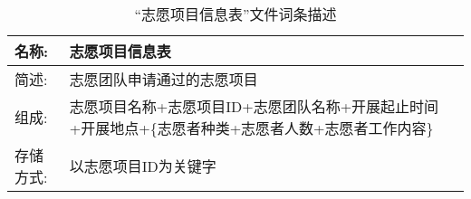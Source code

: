 \begin{table}[H]
  \begin{center}
    \caption{“志愿项目信息表”文件词条描述}
    \begin{tabular}{l p{10cm}}
      \hline
      名称: &  志愿项目信息表\\
      \hline
      简述:  &  志愿团队申请通过的志愿项目\\
      \hline
      组成:  &  志愿项目名称+志愿项目ID+志愿团队名称+开展起止时间+开展地点+\{志愿者种类+志愿者人数+志愿者工作内容\}\\
      \hline
      存储方式:  &  以志愿项目ID为关键字\\
      \hline
    \end{tabular}
    \label{志愿项目信息表}
  \end{center}
\end{table}
